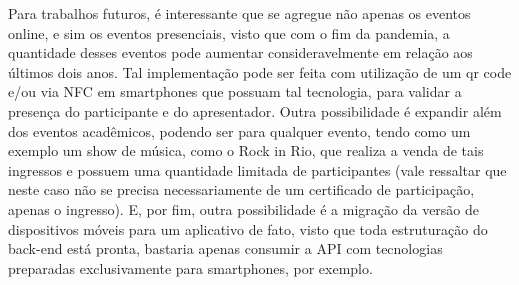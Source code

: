 Para trabalhos futuros, é interessante que se agregue não apenas os eventos online, e sim os eventos presenciais, visto que com o fim da pandemia, a quantidade desses eventos pode aumentar consideravelmente em relação aos últimos dois anos. Tal implementação pode ser feita com utilização de um qr code e/ou via NFC em smartphones que possuam tal tecnologia, para validar a presença do participante e do apresentador. Outra possibilidade é expandir além dos eventos acadêmicos, podendo ser para qualquer evento, tendo como um exemplo um show de música, como o Rock in Rio, que realiza a venda de tais ingressos e possuem uma quantidade limitada de participantes (vale ressaltar que neste caso não se precisa necessariamente de um certificado de participação, apenas o ingresso). E, por fim, outra possibilidade é a migração da versão de dispositivos móveis para um aplicativo de fato, visto que toda estruturação do back-end está pronta, bastaria apenas consumir a API com tecnologias preparadas exclusivamente para smartphones, por exemplo.